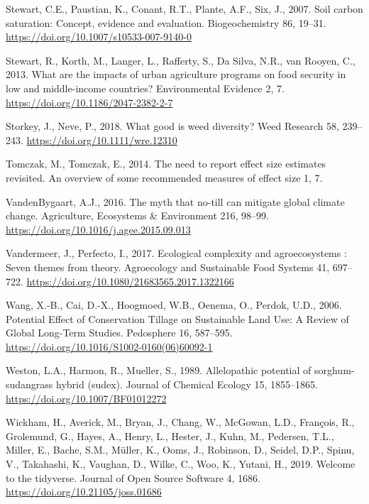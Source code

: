 \documentclass[
  12pt,
]{article}
\newlength{\cslhangindent}
\newlength{\cslentryspacingunit} %
\newenvironment{CSLReferences}[2] %
 {%
  \setlength{\parindent}{0pt}
  \ifodd #1
  \let\oldpar\par
  \def\par{\hangindent=\cslhangindent\oldpar}
  \fi
  \setlength{\parskip}{#2\cslentryspacingunit}
 }%
 {}
\begin{document}
\begin{CSLReferences}{1}{0}
\leavevmode{}%
Stewart, C.E., Paustian, K., Conant, R.T., Plante, A.F., Six, J., 2007. Soil carbon saturation: Concept, evidence and evaluation. Biogeochemistry 86, 19--31. \url{https://doi.org/10.1007/s10533-007-9140-0}

\leavevmode{}%
Stewart, R., Korth, M., Langer, L., Rafferty, S., Da Silva, N.R., van Rooyen, C., 2013. What are the impacts of urban agriculture programs on food security in low and middle-income countries? Environmental Evidence 2, 7. \url{https://doi.org/10.1186/2047-2382-2-7}

\leavevmode{}%
Storkey, J., Neve, P., 2018. What good is weed diversity? Weed Research 58, 239--243. \url{https://doi.org/10.1111/wre.12310}

\leavevmode{}%
Tomczak, M., Tomczak, E., 2014. The need to report effect size estimates revisited. {An} overview of some recommended measures of effect size 1, 7.

\leavevmode{}%
VandenBygaart, A.J., 2016. The myth that no-till can mitigate global climate change. Agriculture, Ecosystems \& Environment 216, 98--99. \url{https://doi.org/10.1016/j.agee.2015.09.013}

\leavevmode{}%
Vandermeer, J., Perfecto, I., 2017. Ecological complexity and agroecosystems : Seven themes from theory. Agroecology and Sustainable Food Systems 41, 697--722. \url{https://doi.org/10.1080/21683565.2017.1322166}

\leavevmode{}%
Wang, X.-B., Cai, D.-X., Hoogmoed, W.B., Oenema, O., Perdok, U.D., 2006. Potential {Effect} of {Conservation Tillage} on {Sustainable Land Use}: {A Review} of {Global Long-Term Studies}. Pedosphere 16, 587--595. \url{https://doi.org/10.1016/S1002-0160(06)60092-1}

\leavevmode{}%
Weston, L.A., Harmon, R., Mueller, S., 1989. Allelopathic potential of sorghum-sudangrass hybrid (sudex). Journal of Chemical Ecology 15, 1855--1865. \url{https://doi.org/10.1007/BF01012272}

\leavevmode{}%
Wickham, H., Averick, M., Bryan, J., Chang, W., McGowan, L.D., François, R., Grolemund, G., Hayes, A., Henry, L., Hester, J., Kuhn, M., Pedersen, T.L., Miller, E., Bache, S.M., Müller, K., Ooms, J., Robinson, D., Seidel, D.P., Spinu, V., Takahashi, K., Vaughan, D., Wilke, C., Woo, K., Yutani, H., 2019. Welcome to the {tidyverse}. Journal of Open Source Software 4, 1686. \url{https://doi.org/10.21105/joss.01686}


\end{CSLReferences}
\end{document}
